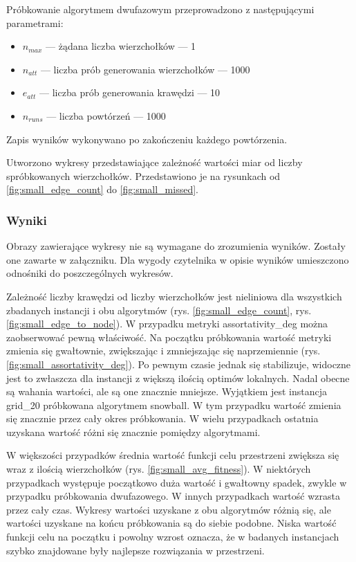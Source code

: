 Próbkowanie algorytmem dwufazowym przeprowadzono z następującymi parametrami:
\begin{itemize}
    \item $n_{max}$ --- żądana liczba wierzchołków --- 1
    \item $n_{att}$ --- liczba prób generowania wierzchołków --- 1000
    \item $e_{att}$ --- liczba prób generowania krawędzi --- 10
    \item $n_{runs}$ --- liczba powtórzeń --- 1000
\end{itemize}
Zapis wyników wykonywano po zakończeniu każdego powtórzenia.

Utworzono wykresy przedstawiające zależność wartości miar od liczby spróbkowanych wierzchołków.
Przedstawiono je na rysunkach od \ref{fig:small_edge_count} do \ref{fig:small_missed}.

\subsubsection{Wyniki}
Obrazy zawierające wykresy nie są wymagane do zrozumienia wyników.
Zostały one zawarte w załączniku. Dla wygody czytelnika w opisie wyników umieszczono odnośniki do poszczególnych wykresów.

Zależność liczby krawędzi od liczby wierzchołków jest nieliniowa dla wszystkich zbadanych instancji i obu algorytmów (rys. \ref{fig:small_edge_count}, rys. \ref{fig:small_edge_to_node}).
W przypadku metryki assortativity\_deg można zaobserwować pewną właściwość.
Na początku próbkowania wartość metryki zmienia się gwałtownie, zwiększając i zmniejszając się naprzemiennie (rys. \ref{fig:small_assortativity_deg}).
Po pewnym czasie jednak się stabilizuje, widoczne jest to zwłaszcza dla instancji z większą ilością optimów lokalnych.
Nadal obecne są wahania wartości, ale są one znacznie mniejsze.
Wyjątkiem jest instancja grid\_20 próbkowana algorytmem snowball.
W tym przypadku wartość zmienia się znacznie przez cały okres próbkowania.
W wielu przypadkach ostatnia uzyskana wartość różni się znacznie pomiędzy algorytmami.

W większości przypadków średnia wartość funkcji celu przestrzeni zwiększa się wraz z ilością wierzchołków (rys. \ref{fig:small_avg_fitness}).
W niektórych przypadkach występuje początkowo duża wartość i gwałtowny spadek, zwykle w przypadku próbkowania dwufazowego.
W innych przypadkach wartość wzrasta przez cały czas.
Wykresy wartości uzyskane z obu algorytmów różnią się, ale wartości uzyskane na końcu próbkowania są do siebie podobne.
Niska wartość funkcji celu na początku i powolny wzrost oznacza, że w badanych instancjach szybko znajdowane były
najlepsze rozwiązania w przestrzeni.

